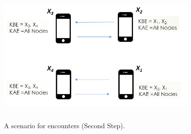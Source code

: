 \documentclass[11pt]{article}
\begin{document}
\begin{figure}[!bp]
\centering
    \includegraphics[width=10cm ,height=7cm]{figures_png/SSHP(MO2)}
    \caption{A scenario for encounters (Second Step).}\label{fig:SSHP(MO2)}
    \label{SSHP(MO2)}
\end{figure}


\end{document}
